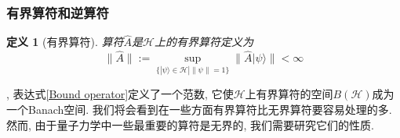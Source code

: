 \documentclass[a4paper,11pt]{article}
\newtheorem{definition}{\hspace{2em}定义}[section]
\begin{document}
\subsubsection{有界算符和逆算符}
\begin{definition}[有界算符]
  算符$\hat{A}$是$\mathcal{H}$上的有界算符定义为
\begin{equation}\label{Bound operator}
  \|\hat{A}\|:=\sup_{\{|\psi\rangle\in\mathcal{H}|\|\psi\|=1\}}\|\hat{A}|\psi\rangle\|<\infty
\end{equation}
\end{definition}
, 表达式\ref{Bound operator}定义了一个范数, 它使$\mathcal{H}$上有界算符的空间$B(\mathcal{H})$成为一个Banach空间. 我们将会看到在一些方面有界算符比无界算符要容易处理的多. 然而, 由于量子力学中一些最重要的算符是无界的, 我们需要研究它们的性质.
\end{document}
